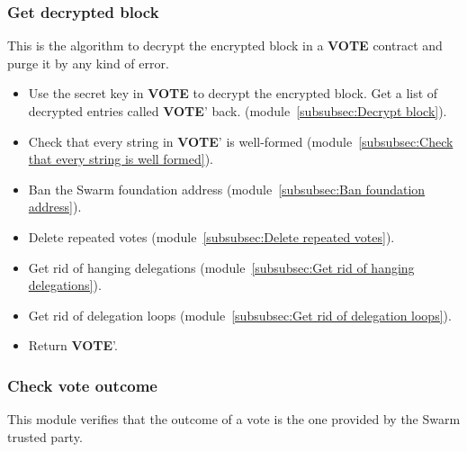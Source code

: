 \documentclass[submission, copyright,creativecommons,sharealike,noncommercial]{eptcs}
\newcommand{\Vote}{\textbf{VOTE}\xspace}
\begin{document}
\subsubsection{Get decrypted block}\label{subsubsec:Get decrypted block}
	This is the algorithm to decrypt the encrypted block in a \Vote contract and purge it by any kind of error.
	\begin{itemize}
		\item Use the secret key in \Vote to decrypt the encrypted block. Get a list of decrypted entries called \Vote' back. (module~\ref{subsubsec:Decrypt block}).
		\item Check that every string in \Vote' is well-formed (module~\ref{subsubsec:Check that every string is well formed}).
		\item Ban the Swarm foundation address (module~\ref{subsubsec:Ban foundation address}).
		\item Delete repeated votes (module~\ref{subsubsec:Delete repeated votes}).
		\item Get rid of hanging delegations (module~\ref{subsubsec:Get rid of hanging delegations}).
		\item Get rid of delegation loops (module~\ref{subsubsec:Get rid of delegation loops}).
		\item Return \Vote'.
	\end{itemize}


\subsubsection{Check vote outcome}\label{subsubsec:Calculate vote outcome}
This module verifies that the outcome of a vote is the one provided by the Swarm trusted party. 
\end{document}
